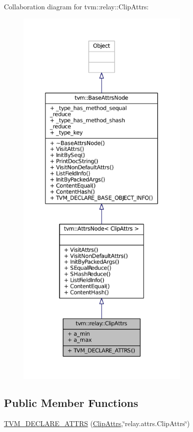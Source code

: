 Collaboration diagram for tvm\+:\+:relay\+:\+:Clip\+Attrs\+:
\nopagebreak
\begin{figure}[H]
\begin{center}
\leavevmode
\includegraphics[height=550pt]{structtvm_1_1relay_1_1ClipAttrs__coll__graph}
\end{center}
\end{figure}
\subsection*{Public Member Functions}
\begin{DoxyCompactItemize}
\item 
\hyperlink{structtvm_1_1relay_1_1ClipAttrs_a751c6dbf39793d4657a81619393f7a20}{T\+V\+M\+\_\+\+D\+E\+C\+L\+A\+R\+E\+\_\+\+A\+T\+T\+RS} (\hyperlink{structtvm_1_1relay_1_1ClipAttrs}{Clip\+Attrs},\char`\"{}relay.\+attrs.\+Clip\+Attrs\char`\"{})
\end{DoxyCompactItemize}
